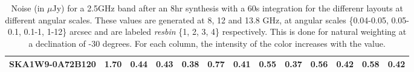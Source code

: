 \begin{table}[!htp]
{{\begin{tabular}{|lcccc||cccc||cccc|}
SKA1W9-0A72B120 & 1.70 \cellcolor{blue!24.00} & 0.44 \cellcolor{red!25.64} & 0.43 \cellcolor{green!32.82} & 0.38 \cellcolor{orange!60.00} & 0.77 \cellcolor{blue!22.38} & 0.41 \cellcolor{red!26.40} & 0.55 \cellcolor{green!51.60} & 0.37 \cellcolor{orange!60.00} & 0.56 \cellcolor{blue!22.88} & 0.42 \cellcolor{red!28.50} & 0.58 \cellcolor{green!60.00} & 0.42 \cellcolor{orange!60.00}\tabularnewline \hline 
\end{tabular}}\hfil 

\caption{Noise (in $\mu$Jy) for a 2.5GHz band after an 8hr synthesis with a 60s integration for the differenr layouts at different angular scales. These values are generated at 8, 12 and 13.8 GHz, at angular scales \{0.04-0.05, 0.05-0.1, 0.1-1, 1-12\} arcsec and are labeled {\it resbin} \{1, 2, 3, 4\} respectively. This is done for natural weighting at a declination of -30 degrees. For each column, the intensity of the color increases with the value.}\label{tab:noise2500}}
 \end{table}